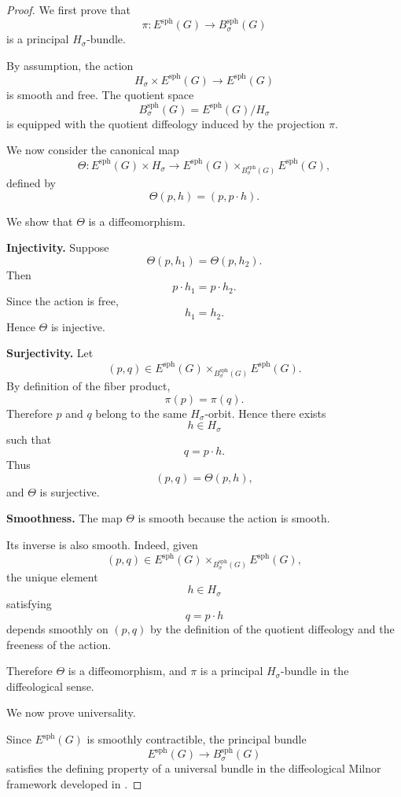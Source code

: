 \documentclass[11pt]{amsart}
\begin{document}
\begin{proof}
We first prove that
\[
\pi:
E^{\mathrm{sph}}(G)
\to
B^{\mathrm{sph}}_\sigma(G)
\]
is a principal \(H_\sigma\)-bundle.

\medskip

By assumption, the action
\[
H_\sigma\times E^{\mathrm{sph}}(G)
\to
E^{\mathrm{sph}}(G)
\]
is smooth and free. The quotient space
\[
B^{\mathrm{sph}}_\sigma(G)
=
E^{\mathrm{sph}}(G)/H_\sigma
\]
is equipped with the quotient diffeology induced by the projection \(\pi\).

We now consider the canonical map
\[
\Theta:
E^{\mathrm{sph}}(G)\times H_\sigma
\longrightarrow
E^{\mathrm{sph}}(G)\times_{B^{\mathrm{sph}}_\sigma(G)}
E^{\mathrm{sph}}(G),
\]
defined by
\[
\Theta(p,h)
=
(p,p\cdot h).
\]

We show that \(\Theta\) is a diffeomorphism.

\medskip

\noindent
\textbf{Injectivity.}
Suppose
\[
\Theta(p,h_1)=\Theta(p,h_2).
\]
Then
\[
p\cdot h_1=p\cdot h_2.
\]
Since the action is free,
\[
h_1=h_2.
\]
Hence \(\Theta\) is injective.

\medskip

\noindent
\textbf{Surjectivity.}
Let
\[
(p,q)
\in
E^{\mathrm{sph}}(G)\times_{B^{\mathrm{sph}}_\sigma(G)}
E^{\mathrm{sph}}(G).
\]
By definition of the fiber product,
\[
\pi(p)=\pi(q).
\]
Therefore \(p\) and \(q\) belong to the same \(H_\sigma\)-orbit. Hence there
exists
\[
h\in H_\sigma
\]
such that
\[
q=p\cdot h.
\]
Thus
\[
(p,q)=\Theta(p,h),
\]
and \(\Theta\) is surjective.

\medskip

\noindent
\textbf{Smoothness.}
The map \(\Theta\) is smooth because the action is smooth.

Its inverse is also smooth. Indeed, given
\[
(p,q)
\in
E^{\mathrm{sph}}(G)\times_{B^{\mathrm{sph}}_\sigma(G)}
E^{\mathrm{sph}}(G),
\]
the unique element
\[
h\in H_\sigma
\]
satisfying
\[
q=p\cdot h
\]
depends smoothly on \((p,q)\) by the definition of the quotient diffeology
and the freeness of the action.

Therefore \(\Theta\) is a diffeomorphism, and \(\pi\) is a principal
\(H_\sigma\)-bundle in the diffeological sense.

\medskip

We now prove universality.

Since \(E^{\mathrm{sph}}(G)\) is smoothly contractible, the principal bundle
\[
E^{\mathrm{sph}}(G)
\to
B^{\mathrm{sph}}_\sigma(G)
\]
satisfies the defining property of a universal bundle in the diffeological
Milnor framework developed in \cite{MagnotWatts2017}.


\end{proof}
\end{document}
